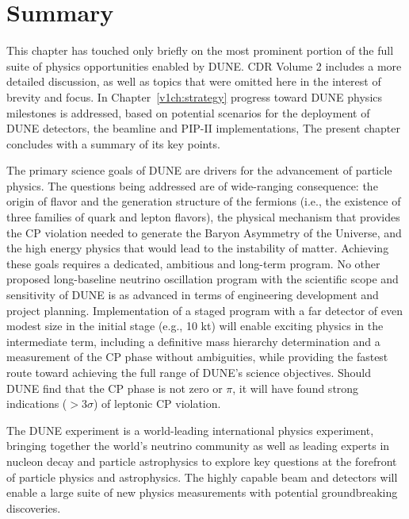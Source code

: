 %
\section{Summary}


This chapter has touched only briefly on the most prominent portion of
the full suite of physics opportunities enabled by DUNE.  
CDR Volume 2 includes a more detailed discussion, as well as topics
that were omitted here in the interest of brevity and focus.  In
Chapter~\ref{v1ch:strategy} progress toward DUNE physics milestones is
addressed, based on potential scenarios for the deployment of DUNE
detectors, the beamline and PIP-II implementations, The present
chapter concludes with a summary of its key points.

The primary science goals of DUNE are drivers for the advancement of
particle physics. The questions being addressed are of wide-ranging
consequence: the origin of flavor and the generation structure of the
fermions (i.e., the existence of three families of quark and lepton
flavors), the physical mechanism that provides the CP violation needed
to generate the Baryon Asymmetry of the Universe, and the high energy
physics that would lead to the instability of matter.  Achieving these
goals requires a dedicated, ambitious and long-term program.  No other
proposed long-baseline neutrino oscillation program with the
scientific scope and sensitivity of DUNE is as advanced in terms of
engineering development and project planning.  Implementation of a
staged program with a far detector of even modest size in the initial
stage (e.g., 10 kt) will enable exciting physics in the intermediate
term, including a definitive mass hierarchy determination and a
measurement of the CP phase without ambiguities, while providing the
fastest route toward achieving the full range of DUNE's science
objectives.  Should DUNE find that the CP phase is not zero or $\pi$,
it will have found strong indications ($>3\sigma$) of leptonic CP
violation.

The DUNE experiment is a world-leading international physics
experiment, bringing together the world's neutrino community as well
as leading experts in nucleon decay and particle astrophysics to
explore key questions at the forefront of particle physics and
astrophysics. The highly capable beam and detectors will enable a
large suite of new physics measurements with potential groundbreaking
discoveries.


